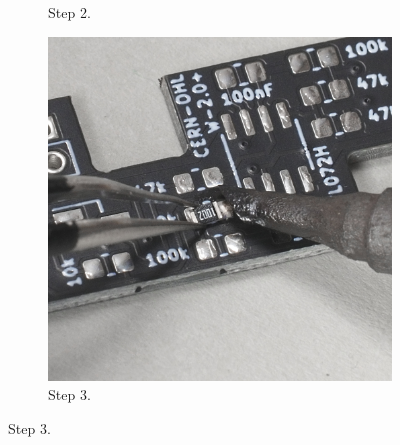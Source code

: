 \documentclass[12pt, a4paper]{article}
\begin{document}
\begin{figure}[H]
\begin{subfigure}{0.3\textwidth}
        \caption*{Step 2.}
    \end{subfigure}
    \hspace{2mm}
    \begin{subfigure}{0.3\textwidth}
        \includegraphics[width=\textwidth]{images/02_03_component_soldering.jpg}
        \caption*{Step 3.}
    \end{subfigure}
\end{figure}
\label{fig:step1-3}

\vspace*{-6mm}
\end{document}
